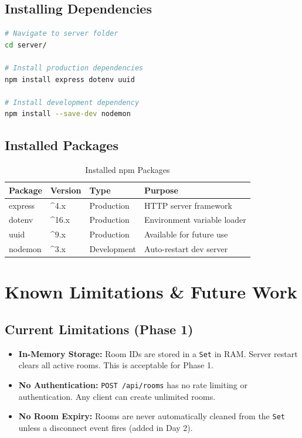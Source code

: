 \documentclass[11pt,a4paper]{article}
\begin{document}
\subsection{Installing Dependencies}

\begin{lstlisting}[language=bash, caption={Dependency Installation}]
# Navigate to server folder
cd server/

# Install production dependencies
npm install express dotenv uuid

# Install development dependency
npm install --save-dev nodemon
\end{lstlisting}

\subsection{Installed Packages}

\begin{table}[h!]
\centering
\begin{tabular}{@{}llll@{}}
\toprule
\textbf{Package} & \textbf{Version} & \textbf{Type} & \textbf{Purpose} \\ \midrule
express  & \textasciicircum 4.x & Production    & HTTP server framework \\
dotenv   & \textasciicircum 16.x & Production   & Environment variable loader \\
uuid     & \textasciicircum 9.x  & Production   & Available for future use \\
nodemon  & \textasciicircum 3.x  & Development  & Auto-restart dev server \\ \bottomrule
\end{tabular}
\caption{Installed npm Packages}
\label{tab:packages}
\end{table}

\section{Known Limitations \& Future Work}

\subsection{Current Limitations (Phase 1)}

\begin{itemize}
    \item \textbf{In-Memory Storage:} Room IDs are stored in a \texttt{Set} in RAM. Server restart clears all active rooms. This is acceptable for Phase 1.
    \item \textbf{No Authentication:} \texttt{POST /api/rooms} has no rate limiting or authentication. Any client can create unlimited rooms.
    \item \textbf{No Room Expiry:} Rooms are never automatically cleaned from the \texttt{Set} unless a disconnect event fires (added in Day 2).
\end{itemize}
\end{document}
